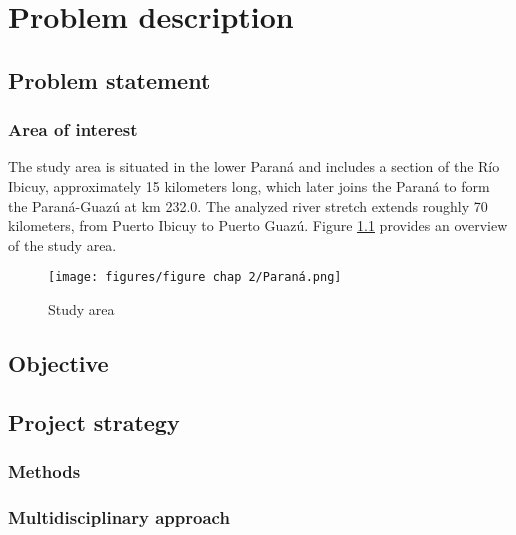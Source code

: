 \chapter{Problem description}

\section{Problem statement}
\subsection{Area of interest}
The study area is situated in the lower Paraná and includes a section of the Río Ibicuy, approximately 15 kilometers long, which later joins the Paraná to form the Paraná-Guazú at km 232.0. The analyzed river stretch extends roughly 70 kilometers, from Puerto Ibicuy to Puerto Guazú. Figure \ref{fig:study area} provides an overview of the study area.

\begin{figure}[H]
    \centering
    \texttt{[image: figures/figure chap 2/Paraná.png]}
    \caption{Study area}
    \label{fig:study area}
\end{figure}


\section{Objective}

\section{Project strategy}
\subsection{Methods}
\subsection{Multidisciplinary approach}